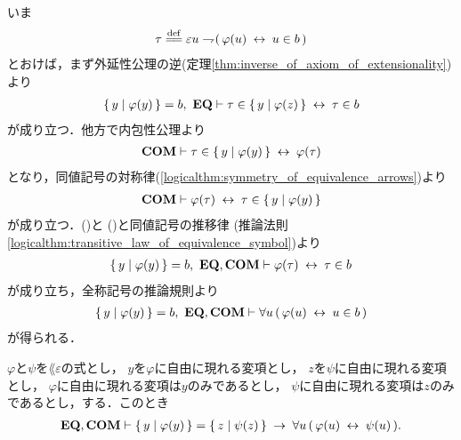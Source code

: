 	\begin{sketch}
		いま
		\begin{align}
			\tau \defeq \varepsilon u \negation (\, \varphi(u) \lrarrow u \in b\, )
		\end{align}
		とおけば，まず外延性公理の逆(定理\ref{thm:inverse_of_axiom_of_extensionality})より
		\begin{align}
			\left\{\, y \mid \varphi(y)\, \right\} = b,\ \mbox{{\bf EQ}} \vdash 
			\tau \in \left\{\, y \mid \varphi(z)\, \right\} \hspace{0.25em}\leftrightarrow\hspace{0.25em} \tau \in b
			\label{fom:equivalent_formula_rewriting_3_1}
		\end{align}
		が成り立つ．他方で内包性公理より
		\begin{align}
			\mbox{\bf COM} \vdash \tau \in \left\{\, y \mid \varphi(y)\, \right\} \hspace{0.25em}\leftrightarrow\hspace{0.25em} \varphi(\tau)
		\end{align}
		となり，同値記号の対称律(\ref{logicalthm:symmetry_of_equivalence_arrows})より
		\begin{align}
			\mbox{\bf COM} \vdash \varphi(\tau) \hspace{0.25em}\leftrightarrow\hspace{0.25em} \tau \in \left\{\, y \mid \varphi(y)\, \right\}
			\label{fom:equivalent_formula_rewriting_3_2}
		\end{align}
		が成り立つ．()と
		()と同値記号の推移律
		(推論法則\ref{logicalthm:transitive_law_of_equivalence_symbol})より
		\begin{align}
			\left\{\, y \mid \varphi(y)\, \right\} = b,\ \mbox{{\bf EQ}},\mbox{\bf COM} \vdash 
			\varphi(\tau) \hspace{0.25em}\leftrightarrow\hspace{0.25em} \tau \in b 
		\end{align}
		が成り立ち，全称記号の推論規則より
		\begin{align}
			\left\{\, y \mid \varphi(y)\, \right\} = b,\ \mbox{{\bf EQ}},\mbox{\bf COM} \vdash 
			\forall u\, (\, \varphi(u) \hspace{0.25em}\leftrightarrow\hspace{0.25em} u \in b\, )
		\end{align}
		が得られる．
		\QED
	\end{sketch}
	
	\begin{screen}
		\begin{thm}
		\label{thm:equivalent_formula_rewriting_5}
			$\varphi$と$\psi$を$\lang{\varepsilon}$の式とし，
			$y$を$\varphi$に自由に現れる変項とし，
			$z$を$\psi$に自由に現れる変項とし，
			$\varphi$に自由に現れる変項は$y$のみであるとし，
			$\psi$に自由に現れる変項は$z$のみであるとし，する．このとき
			\begin{align}
				\mbox{{\bf EQ}},\mbox{\bf COM} \vdash \left\{\, y \mid \varphi(y)\, \right\} = \left\{\, z \mid \psi(z)\, \right\}
				\hspace{0.25em}\rightarrow\hspace{0.25em} \forall u\, (\, \varphi(u) \hspace{0.25em}\leftrightarrow\hspace{0.25em} \psi(u)\, ).
			\end{align}
		\end{thm}
	\end{screen}
	
